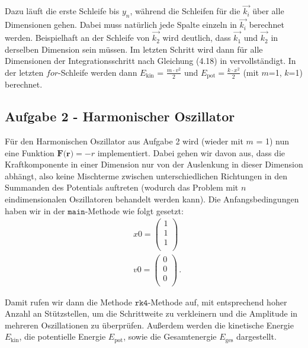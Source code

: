 Dazu läuft die erste Schleife bis $y_n$, während die Schleifen für die $\vec{k_i}$ über alle Dimensionen gehen. Dabei muss natürlich jede Spalte einzeln in $\vec{k_i}$ berechnet werden. Beispielhaft an der Schleife von $\vec{k_2}$ wird deutlich, dass $\vec{k_1}$ und $\vec{k_2}$ in derselben Dimension sein müssen.
Im letzten Schritt wird dann für alle Dimensionen der Integrationsschritt nach Gleichung (4.18) in \cite[52]{script} vervollständigt. In der letzten $\textit{for}$-Schleife werden dann $E_{\text{kin}}$ = $\frac{m\cdot v^2}{2}$ und $E_{\text{pot}} = \frac{k \cdot x^2}{2}$ (mit $m$=1, $k$=1) berechnet.
\subsection*{Aufgabe 2 - Harmonischer Oszillator}
Für den Harmonischen Oszillator aus Aufgabe 2 wird (wieder mit $m$ = 1) nun eine Funktion $\textbf{F(r)} = -r$ implementiert. Dabei gehen wir davon aus, dass die Kraftkomponente in einer Dimension nur von der Auslenkung in dieser Dimension abhängt, also keine Mischterme zwischen unterschiedlichen Richtungen in den Summanden des Potentials auftreten (wodurch das Problem mit $n$ eindimensionalen Oszillatoren behandelt werden kann). Die Anfangsbedingungen haben wir in der $\texttt{main}$-Methode wie folgt gesetzt:
\begin{equation*}
	\begin{split}
		&x0 =
		 \begin{pmatrix}
			1\\
			1\\
			1 \\
		\end{pmatrix} \\
		& v0 = 
		\begin{pmatrix}
		0 \\
		0 \\
		0 \\
		\end{pmatrix} \,.
	\end{split}
\end{equation*}

Damit rufen wir dann die Methode $\texttt{rk4}$-Methode auf, mit entsprechend hoher Anzahl an Stützstellen, um die Schrittweite zu verkleinern und die Amplitude in mehreren Oszillationen zu überprüfen. Außerdem werden die kinetische Energie $E_{\text{kin}}$, die potentielle Energie $E_{\text{pot}}$, sowie die Gesamtenergie $E_{\text{ges}}$ dargestellt.
\begin{landscape}
	\begin{figure}
		\texttt{[image: ../A1+A2/Aufgabe2a1.pdf]}}
		\caption{Graphische Darstellung der Ergebnisse von Aufgabe 2a ( $\vec{\textbf{r}}(0)$ bel, $v(0) = \vec{0}$).}
		\label{fig:a21}
	\end{figure}
\end{landscape}

